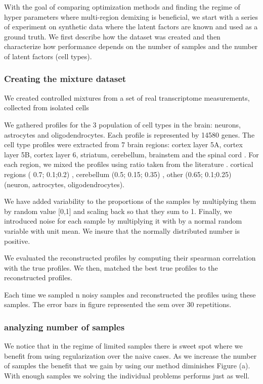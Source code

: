 

With the goal of comparing optimization methods and finding the regime of hyper parameters where multi-region demixing is beneficial, we start with a series of experiment on synthetic data where the latent factors are known and used as a ground truth. We first describe how the dataset was created and then characterize how performance depends on the number of samples and the number of latent factors (cell types).


\subsubsection*{Creating the mixture dataset}
We created controlled mixtures from a set of real transcriptome measurements, collected from isolated cells



We gathered profiles for the 3 population of cell types in the brain: neurons, astrocytes and oligodendrocytes. Each profile is represented by 14580 genes. The cell type profiles were extracted from 7 brain regions:  cortex layer 5A, cortex layer 5B, cortex layer 6, striatum, cerebellum, brainstem and the spinal cord \cite{okaty2011cell}. For each region, we mixed the profiles using ratio taken from the literature \cite{Herculano2014}. cortical regions ( 0.7; 0.1;0.2) , cerebellum (0.5; 0.15; 0.35) , other (0.65;  0.1;0.25)  (neuron, astrocytes, oligodendrocytes).

We have added variability to the proportions of the samples by multiplying them by random value [0,1] and scaling back so that they sum to 1.
Finally, we introduced noise for each sample by multiplying it with by a normal random variable with unit mean. We insure that the normally distributed number is positive.

We evaluated the reconstructed profiles by computing their spearman correlation with the true profiles. We then, matched the best true profiles to the reconstructed profiles.

Each time we sampled n noisy samples and reconstructed the profiles using these samples. The error bars in figure  represented the sem over 30 repetitions.  

\subsubsection*{analyzing number of samples}
We notice that in the regime of limited samples there is sweet spot where we benefit from using regularization over the naive cases. As we increase the number of samples the benefit that we gain by using our method diminishes Figure \label{fig:controlled_exp}(a). With enough samples we solving the individual problems performs just as well. 



